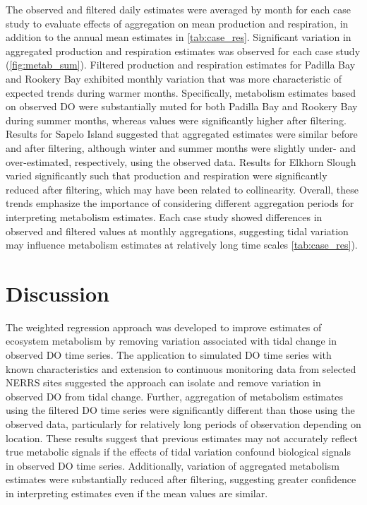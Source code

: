 \documentclass[letterpaper,12pt,oneside]{article}\usepackage[]{graphicx}\usepackage[]{color}
\begin{document}
The observed and filtered daily estimates were averaged by month for each case study to evaluate effects of aggregation on mean production and respiration, in addition to the annual mean estimates in \cref{tab:case_res}. Significant variation in aggregated production and respiration estimates was observed for each case study (\cref{fig:metab_sum}).  Filtered production and respiration estimates for Padilla Bay and Rookery Bay exhibited monthly variation that was more characteristic of expected trends during warmer months.  Specifically, metabolism estimates based on observed \ac{DO} were substantially muted for both Padilla Bay and Rookery Bay during summer months, whereas values were significantly higher after filtering. Results for Sapelo Island suggested that aggregated estimates were similar before and after filtering, although winter and summer months were slightly under- and over-estimated, respectively, using the observed data.  Results for Elkhorn Slough varied significantly such that production and respiration were significantly reduced after filtering, which may have been related to collinearity.  Overall, these trends emphasize the importance of considering different aggregation periods for interpreting metabolism estimates.  Each case study showed differences in observed and filtered values at monthly aggregations, suggesting tidal variation may influence metabolism estimates at relatively long time scales \cref{tab:case_res}).      

 

\section{Discussion}

The weighted regression approach was developed to improve estimates of ecosystem metabolism by removing variation associated with tidal change in observed \ac{DO} time series.  The application to simulated \ac{DO} time series with known characteristics and extension to continuous monitoring data from selected \ac{NERRS} sites suggested the approach can isolate and remove variation in observed \ac{DO} from tidal change.  Further, aggregation of metabolism estimates using the filtered \ac{DO} time series were significantly different than those using the observed data, particularly for relatively long periods of observation depending on location. These results suggest that previous estimates may not accurately reflect true metabolic signals if the effects of tidal variation confound biological signals in observed \ac{DO} time series.  Additionally, variation of aggregated metabolism estimates were substantially reduced after filtering, suggesting greater confidence in interpreting estimates even if the mean values are similar.
\end{document}
